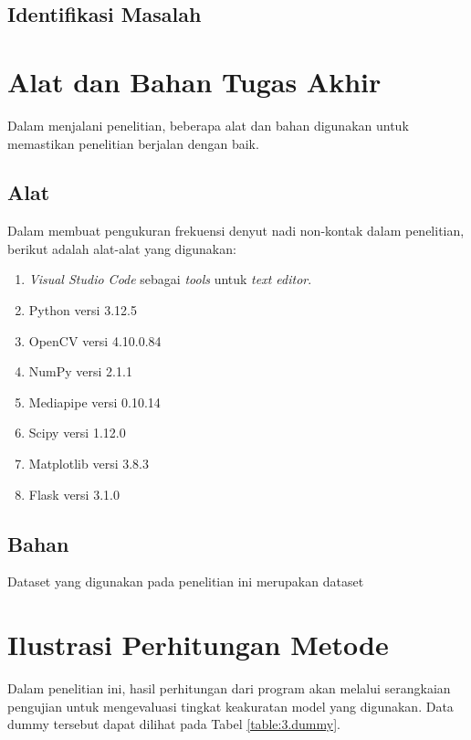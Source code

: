\subsection{Identifikasi Masalah} \label{III.Identifikasi_masalah}
\lipsum[1] %


\section{Alat dan Bahan Tugas Akhir} \label{III.Alat dan Bahan}
Dalam menjalani penelitian, beberapa alat dan bahan digunakan untuk memastikan penelitian berjalan dengan baik.\par

\subsection{Alat} \label{III.Alat}
Dalam membuat pengukuran frekuensi denyut nadi non-kontak dalam penelitian, berikut adalah alat-alat yang digunakan: \par
\begin{enumerate}[noitemsep]
	\item \textit{Visual Studio Code} sebagai \textit{tools} untuk \textit{text editor}.
	\item Python versi 3.12.5
        \item OpenCV versi 4.10.0.84
	\item NumPy versi 2.1.1
	\item Mediapipe versi 0.10.14
	\item Scipy versi 1.12.0
        \item Matplotlib versi 3.8.3
        \item Flask versi 3.1.0
\end{enumerate}

\subsection{Bahan} \label{III.Bahan}
Dataset yang digunakan pada penelitian ini merupakan dataset 

\section{Ilustrasi Perhitungan Metode} \label{III.Ilustrasi}
Dalam penelitian ini, hasil perhitungan dari program akan melalui serangkaian pengujian untuk mengevaluasi tingkat keakuratan model yang digunakan. Data dummy tersebut dapat dilihat pada Tabel \ref{table:3.dummy}. \par


